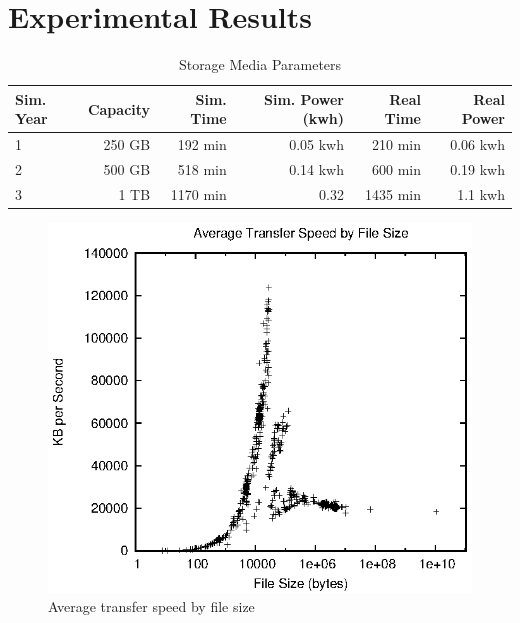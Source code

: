 \section{Experimental Results}

\begin{table}[!hbt]
\begin{minipage}{\linewidth}
\centering
  \caption{Storage Media Parameters}
  \label{tab:comp}
  \begin{tabular}{lr|rr|rr}
    \toprule
    \textbf{Sim. Year}&\textbf{Capacity}&\textbf{Sim. Time}&\textbf{Sim. Power (kwh)}&\textbf{Real Time}&\textbf{Real Power}\\
    \midrule
    1&250 GB&192 min&0.05 kwh&210 min&0.06 kwh\\
    2&500 GB&518 min&0.14 kwh&600 min&0.19 kwh\\
    3&1 TB&1170 min&0.32&1435 min&1.1 kwh\\
  \bottomrule
\end{tabular}
\end{minipage}
\end{table}


\begin{figure}[!ht]
\includegraphics[width=\linewidth]{fig6.eps}
\caption{Average transfer speed by file size}
\label{fig6}
\end{figure}

